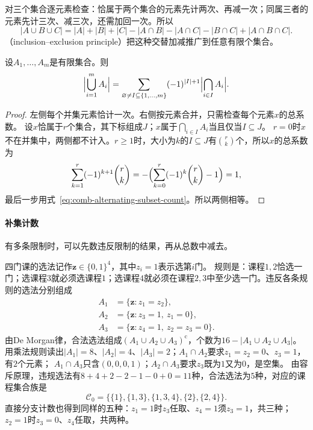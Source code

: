 对三个集合逐元素检查：恰属于两个集合的元素先计两次、再减一次；同属三者的元素先计三次、减三次，还需加回一次。所以
\[
 |A\cup B\cup C|=|A|+|B|+|C|-|A\cap B|-|A\cap C|-|B\cap C|+|A\cap B\cap C|.
\]
（inclusion--exclusion principle）把这种交替加减推广到任意有限个集合。
\begin{theorem}[有限容斥原理]
\label{thm:comb-inclusion-exclusion}
设$A_1,\ldots,A_m$是有限集合。则
\begin{equation}
  \Bigl|\bigcup_{i=1}^{m}A_i\Bigr|
  =\sum_{\varnothing\neq I\subseteq\{1,\ldots,m\}}(-1)^{|I|+1}\Bigl|\bigcap_{i\in I}A_i\Bigr|.
  \label{eq:comb-inclusion-exclusion}
\end{equation}
\end{theorem}
\begin{proof}
左侧每个并集元素恰计一次。右侧按元素合并，只需检查每个元素$x$的总系数。
设$x$恰属于$r$个集合，其下标组成$J$；$x$属于$\bigcap_{i\in I}A_i$当且仅当$I\subseteq J$。
$r=0$时$x$不在并集中，两侧都不计入。$r\geq1$时，大小为$k$的$I\subseteq J$有$\binom rk$个，所以$x$的总系数为
\[
 \sum_{k=1}^r(-1)^{k+1}\binom rk=-\Bigl(\sum_{k=0}^r(-1)^k\binom rk-1\Bigr)=1,
\]
最后一步用式~\eqref{eq:comb-alternating-subset-count}。所以两侧相等。
\end{proof}

\paragraph{补集计数}
有多条限制时，可以先数违反限制的结果，再从总数中减去。
\begin{example}[带限制的选课方案]
\label{ex:comb-constrained-course-selection}
四门课的选法记作$\bm z\in\{0,1\}^4$，其中$z_i=1$表示选第$i$门。
规则是：课程$1,2$恰选一门；选课程$3$就必须选课程$1$；选课程$4$就必须在课程$2,3$中至少选一门。违反各条规则的选法分别组成
\[
 \begin{aligned}
 A_1&=\{\bm z:z_1=z_2\},\\
 A_2&=\{\bm z:z_3=1,\ z_1=0\},\\
 A_3&=\{\bm z:z_4=1,\ z_2=z_3=0\}.
 \end{aligned}
\]
由De Morgan律，合法选法组成$(A_1\cup A_2\cup A_3)^{\mathrm c}$，个数为$16-|A_1\cup A_2\cup A_3|$。
用乘法规则读出$|A_1|=8$、$|A_2|=4$、$|A_3|=2$；$A_1\cap A_2$要求$z_1=z_2=0$、$z_3=1$，有$2$个元素；
$A_1\cap A_3$只含$(0,0,0,1)$；$A_2\cap A_3$要求$z_3$既为$1$又为$0$，是空集。
由容斥原理，违规选法有$8+4+2-2-1-0+0=11$种，合法选法为$5$种，对应的课程集合族是
\begin{equation}
 \mathcal C_0=\bigl\{\{1\},\{1,3\},\{1,3,4\},\{2\},\{2,4\}\bigr\}.
 \label{eq:comb-running-feasible-family}
\end{equation}
直接分支计数也得到同样的五种：$z_1=1$时$z_3$任取、$z_4=1$须$z_3=1$，共三种；$z_2=1$时$z_3=0$、$z_4$任取，共两种。
\end{example}


